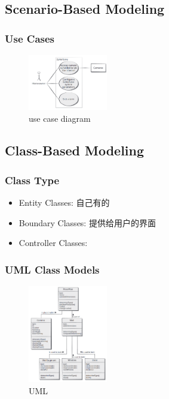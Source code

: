 \subsection{Scenario-Based Modeling}
\subsubsection{Use Cases}

\begin{figure}[!htb]
    \centering
    \includegraphics[width=0.309\textwidth]{pic/SE4/use case diagram}
    \caption{use case diagram}
\end{figure}

\subsection{Class-Based Modeling}

\subsubsection{Class Type}
\begin{itemize}
    \item Entity Classes: 自己有的
    \item Boundary Classes: 提供给用户的界面
    \item Controller Classes: 
\end{itemize}

\subsubsection{UML Class Models}
\begin{figure}[!htb]
    \centering
    \includegraphics[width=0.309\textwidth]{pic/SE4/UML}
    \caption{UML}
\end{figure}


